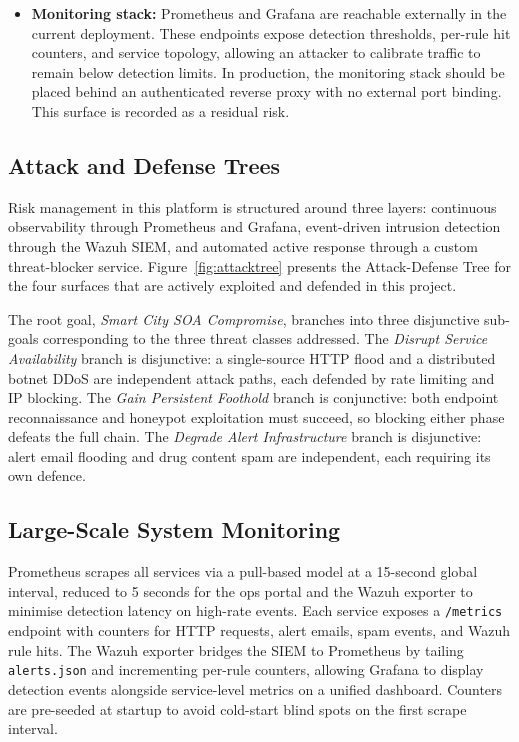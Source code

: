 \begin{itemize}[leftmargin=*]
        unauthenticated in the current implementation. An attacker with network
        access could enumerate the full service topology or register a rogue
        service, poisoning discovery for legitimate callers. This surface is
        recorded as a residual risk.
  \item \textbf{Monitoring stack:} Prometheus and Grafana
      are reachable externally in the current deployment. These
        endpoints expose detection thresholds, per-rule hit counters, and service
        topology, allowing an attacker to calibrate traffic to remain below
        detection limits. In production, the monitoring stack should be placed
        behind an authenticated reverse proxy with no external port binding.
        This surface is recorded as a residual risk.
\end{itemize}

\subsection{Attack and Defense Trees}

Risk management in this platform is structured around three layers: continuous
observability through Prometheus and Grafana, event-driven intrusion detection through
the Wazuh SIEM, and automated active response through a custom threat-blocker service.
Figure~\ref{fig:attacktree} presents the Attack-Defense Tree for the four surfaces
that are actively exploited and defended in this project.

The root goal, \emph{Smart City SOA Compromise}, branches into three disjunctive
sub-goals corresponding to the three threat classes addressed. The
\emph{Disrupt Service Availability} branch is disjunctive: a single-source HTTP
flood and a distributed botnet DDoS are independent attack paths, each defended by
rate limiting and IP blocking. The \emph{Gain Persistent Foothold} branch is
conjunctive: both endpoint reconnaissance and honeypot exploitation must succeed,
so blocking either phase defeats the full chain. The
\emph{Degrade Alert Infrastructure} branch is disjunctive: alert email flooding
and drug content spam are independent, each requiring its own defence.

\subsection{Large-Scale System Monitoring}

Prometheus scrapes all services via a pull-based model at a 15-second global interval,
reduced to 5 seconds for the ops portal and the Wazuh exporter to minimise detection
latency on high-rate events.
Each service exposes a \texttt{/metrics} endpoint with counters for HTTP requests,
alert emails, spam events, and Wazuh rule hits. The Wazuh exporter bridges the SIEM
to Prometheus by tailing \texttt{alerts.json} and incrementing per-rule counters,
allowing Grafana to display detection events alongside service-level metrics on a
unified dashboard. Counters are pre-seeded at startup to avoid cold-start blind spots
on the first scrape interval.

